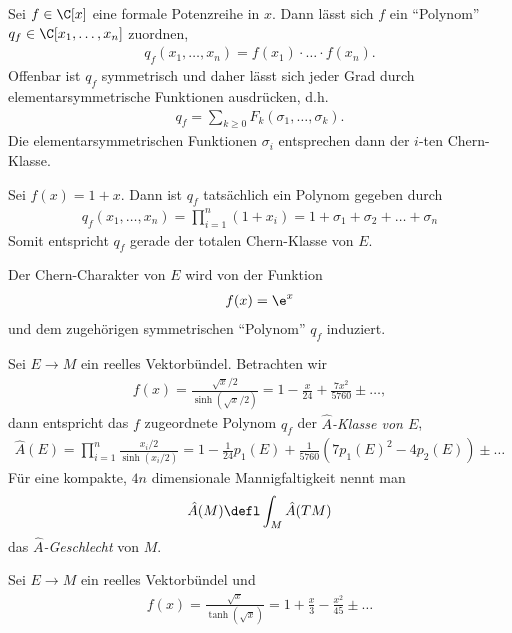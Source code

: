 \documentclass[%
	paper=a5,%
	fleqn,%
	DIV=18,%
	BCOR=0mm,
	fontsize=11pt,
	titlepage=false,%
	bibliography=totoc,
	DIV=18,%
	twoside=true,
	pdftitle=Riemannsche Geometrie,
	pdfauthor=Uwe Semmelmann,
	numbers=noendperiod]%
	{scrbook}
\begin{document}
Sei $f\in \C[x]$ eine formale Potenzreihe in $x$. Dann lässt sich $f$ ein ``Polynom'' $q_{f} \in \C[x_{1},\ldots,x_{n}]$ zuordnen,
\begin{align*}
q_{f}(x_{1},\ldots,x_{n}) = f(x_{1})\cdot \ldots \cdot f(x_{n}).
\end{align*}
Offenbar ist $q_{f}$ symmetrisch und daher lässt sich jeder Grad durch elementarsymmetrische Funktionen ausdrücken, d.h.
\begin{align*}
q_{f} = \sum_{k\ge 0} F_{k}(\sigma_{1},\ldots,\sigma_{k}).
\end{align*}
Die elementarsymmetrischen Funktionen $\sigma_{i}$ entsprechen dann der $i$-ten Chern-Klasse.

\begin{ex}
\begin{exenum}
\item
Sei $f(x) = 1+x$. Dann ist $q_{f}$ tatsächlich ein Polynom gegeben durch
\begin{align*}
q_{f}(x_{1},\ldots,x_{n}) = \prod_{i=1}^n (1+x_{i}) = 1+\sigma_{1}+\sigma_{2}+ \ldots + \sigma_n
\end{align*}
Somit entspricht $q_{f}$ gerade der totalen Chern-Klasse von $E$.
\item Der Chern-Charakter von $E$ wird von der Funktion
\begin{align*}
f(x) = \e^x
\end{align*}
und dem zugehörigen symmetrischen ``Polynom'' $q_{f}$ induziert.
\item Sei $E\to M$ ein reelles Vektorbündel. Betrachten wir
\begin{align*}
f(x) = \frac{\sqrt{x}/2}{\sinh(\sqrt{x}/2)} = 1 - \frac{x}{24} + \frac{7x^2}{5760} \pm \ldots,
\end{align*}
dann entspricht das $f$ zugeordnete Polynom $q_{f}$ der \emph{$\hat{A}$-Klasse von $E$},
\begin{align*}
\hat{A}(E) = \prod_{i=1}^n \frac{x_{i}/2}{\sinh(x_{i}/2)}
=
 1 - \frac{1}{24}p_{1}(E) + \frac{1}{5760}\left(7p_{1}(E)^2 - 4p_{2}(E)\right) \pm \ldots
\end{align*}
Für eine kompakte, $4n$ dimensionale Mannigfaltigkeit nennt man
\begin{align*}
\hat{A}(M) \defl \int_{M} \hat{A}(TM)
\end{align*}
das \emph{$\hat{A}$-Geschlecht} von $M$.
\item Sei $E\to M$ ein reelles Vektorbündel und
\begin{align*}
f(x) = \frac{\sqrt{x}}{\tanh(\sqrt{x})} = 1 + \frac{x}{3} - \frac{x^2}{45} \pm \ldots

\end{align*}
\end{exenum}
\end{ex}
\end{document}
